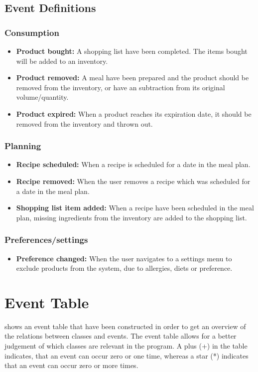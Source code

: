 \subsection{Event Definitions}

\subsubsection{Consumption}
\begin{itemize}
\item \textbf{Product bought:} A shopping list have been completed. The items bought will be added to an inventory.
\item \textbf{Product removed:} A meal have been prepared and the product should be removed from the inventory, or have an subtraction from its original volume/quantity.
\item \textbf{Product expired:} When a product reaches its expiration date, it should be removed from the inventory and thrown out.
\end{itemize}

\subsubsection{Planning}
\begin{itemize}
    \item \textbf{Recipe scheduled:} When a recipe is scheduled for a date in the meal plan.
    \item \textbf{Recipe removed:} When the user removes a recipe which was scheduled for a date in the meal plan.
    \item \textbf{Shopping list item added:} When a recipe have been scheduled in the meal plan, missing ingredients from the inventory are added to the shopping list.
\end{itemize}

\subsubsection{Preferences/settings}
\begin{itemize}
\item \textbf{Preference changed:} When the user navigates to a settings menu to exclude products from the system, due to allergies, diets or preference.
\end{itemize}

\section{Event Table}
 shows an event table that have been constructed in order to get an overview of the relations between classes and events. The event table allows for a better judgement of which classes are relevant in the program. A plus (+) in the table indicates, that an event can occur zero or one time, whereas a star (*) indicates that an event can occur zero or more times.

